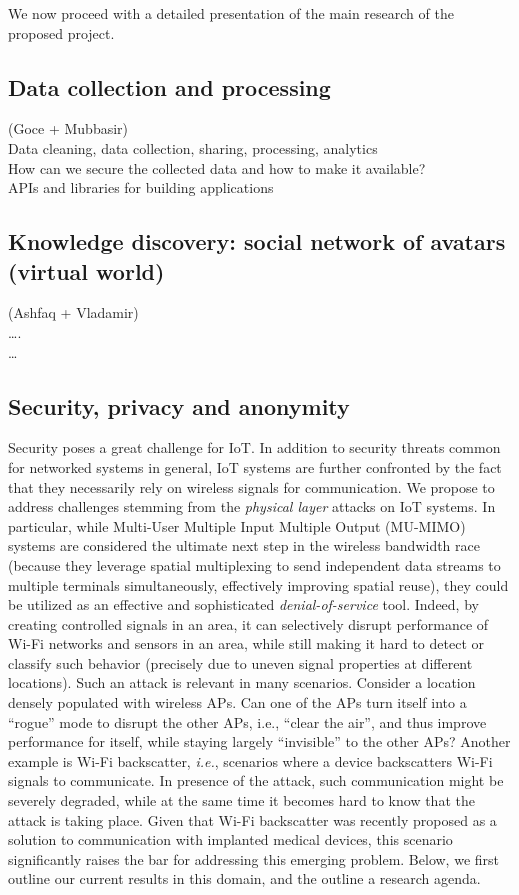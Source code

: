 We now proceed with a detailed presentation of the main research of the proposed project. 


\subsection{Data collection and processing} 
(Goce + Mubbasir)\\
Data cleaning, data collection, sharing, processing, analytics\\
How can we secure the collected data and how to make it available?\\
APIs and libraries for building applications 


 

\subsection{Knowledge discovery: social network of avatars (virtual world)}
(Ashfaq + Vladamir)\\
….\\
…\\

\subsection{Security, privacy and anonymity}



Security poses a great challenge for IoT. In addition to security threats common for networked systems in general, IoT systems are further confronted by the fact that they necessarily rely on wireless signals for communication. We propose to address challenges stemming from the \emph{physical layer} attacks on IoT systems. In particular, while Multi-User Multiple Input Multiple Output (MU-MIMO) systems are considered the ultimate next step in the wireless bandwidth race (because they leverage spatial multiplexing to send independent data streams to multiple terminals simultaneously, effectively improving spatial reuse), they could be utilized as an effective and sophisticated \emph{denial-of-service} tool. Indeed, by creating controlled signals in an area, it can selectively disrupt performance of Wi-Fi networks and sensors in an area, while still making it hard to detect or classify such behavior (precisely due to uneven signal properties at different locations). Such an attack is relevant in many scenarios. Consider a location densely populated with wireless APs. Can one of the APs turn itself into a “rogue” mode to disrupt the other APs, i.e., “clear the air”, and thus improve performance for itself, while staying largely “invisible” to the other APs? Another example is Wi-Fi backscatter, \emph{i.e.}, scenarios where a device backscatters Wi-Fi signals to communicate. In presence of the attack, such communication might be severely degraded, while at the same time it becomes hard to know that the attack is taking place. Given that Wi-Fi backscatter was recently proposed as a solution to communication with implanted medical devices, this scenario significantly raises the bar for addressing this emerging problem. Below, we first outline our current results in this domain, and the outline a research agenda. 


